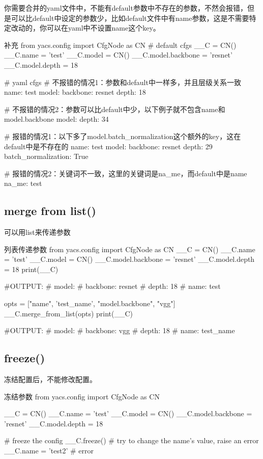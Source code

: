 \documentclass[11pt]{article}
\begin{document}
你需要合并的yaml文件中，不能有default参数中不存在的参数，不然会报错，但是可以比default中设定的参数少，比如default文件中有name参数，这是不需要特定改动的，你可以在yaml中不设置name这个key。
	\begin{Python}{补充}
	from yacs.config import CfgNode as CN
	# default cfgs
	__C = CN()
	__C.name = 'test'
	__C.model = CN()
	__C.model.backbone = 'resnet'
	__C.model.depth = 18
	
	# yaml cfgs
	# 不报错的情况1：参数和default中一样多，并且层级关系一致
	name: test
	model:
	backbone: resnet
	depth: 18
	
	# 不报错的情况2：参数可以比default中少，以下例子就不包含name和model.backbone
	model: 
	depth: 34
	
	# 报错的情况1：以下多了model.batch_normalization这个额外的key，这在default中是不存在的
	name: test
	model:
	backbone: resnet
	depth: 29
	batch_normalization: True
	
	# 报错的情况2：关键词不一致，这里的关键词是na_me，而default中是name
	na_me: test
	\end{Python}
\subsection{merge from list()}
可以用list来传递参数
	\begin{Python}{列表传递参数}
	from yacs.config import CfgNode as CN
	__C = CN()
	__C.name = 'test'
	__C.model = CN()
	__C.model.backbone = 'resnet'
	__C.model.depth = 18
	print(__C)
	
	#OUTPUT:
	#		model:
	#		backbone: resnet
	#		depth: 18
	#		name: test
	
	opts = ["name", 'test_name', "model.backbone", "vgg"]
	__C.merge_from_list(opts)
	print(__C)
	
	#OUTPUT:
	#	model:
	#	backbone: vgg
	#	depth: 18
	#	name: test_name
	\end{Python}
\subsection{freeze()}
冻结配置后，不能修改配置。
	\begin{Python}{冻结参数}
		from yacs.config import CfgNode as CN
		
		__C = CN()
		__C.name = 'test'
		__C.model = CN()
		__C.model.backbone = 'resnet'
		__C.model.depth = 18
		
		# freeze the config
		__C.freeze()
		# try to change the name's value, raise an error
		__C.name = 'test2'  # error
	\end{Python}
\end{document}
